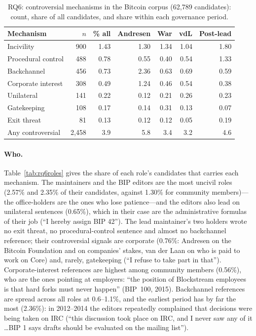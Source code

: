 \begin{table}[t]
\caption{RQ6: controversial mechanisms in the Bitcoin corpus (62,789 candidates): count, share of all candidates, and share within each governance period.}
\label{tab:rq6}
\footnotesize
\setlength{\tabcolsep}{3.5pt}
\begin{tabular}{lrrrrrr}
\toprule
Mechanism & $n$ & \% all & Andresen & War & vdL & Post-lead \\
\midrule
Incivility & 900 & 1.43 & 1.30 & 1.34 & 1.04 & 1.80 \\
Procedural control & 488 & 0.78 & 0.55 & 0.40 & 0.54 & 1.33 \\
Backchannel & 456 & 0.73 & 2.36 & 0.63 & 0.69 & 0.59 \\
Corporate interest & 308 & 0.49 & 1.24 & 0.46 & 0.54 & 0.38 \\
Unilateral & 141 & 0.22 & 0.12 & 0.21 & 0.26 & 0.23 \\
Gatekeeping & 108 & 0.17 & 0.14 & 0.31 & 0.13 & 0.07 \\
Exit threat & 81 & 0.13 & 0.12 & 0.12 & 0.05 & 0.19 \\
\midrule
Any controversial & 2,458 & 3.9 & 5.8 & 3.4 & 3.2 & 4.6 \\
\bottomrule
\end{tabular}
\end{table}

\paragraph{Who.} Table~\ref{tab:rq6roles} gives the share of each role's candidates that carries each mechanism. The maintainers and the BIP editors are the most uncivil roles (2.57\% and 2.35\% of their candidates, against 1.30\% for community members)---the office-holders are the ones who lose patience---and the editors also lead on unilateral sentences (0.65\%), which in their case are the administrative formulas of their job (``I hereby assign BIP 42''). The lead maintainer's two holders wrote no exit threat, no procedural-control sentence and almost no backchannel reference; their controversial signals are corporate (0.76\%: Andresen on the Bitcoin Foundation and on companies' stakes, van der Laan on who is paid to work on Core) and, rarely, gatekeeping (``I refuse to take part in that''). Corporate-interest references are highest among community members (0.56\%), who are the ones pointing at employers: ``the position of Blockstream employees is that hard forks must never happen'' (BIP~100, 2015). Backchannel references are spread across all roles at 0.6--1.1\%, and the earliest period has by far the most (2.36\%): in 2012--2014 the editors repeatedly complained that decisions were being taken on IRC (``this discussion took place on IRC, and I never saw any of it \ldots BIP 1 says drafts should be evaluated on the mailing list'').

